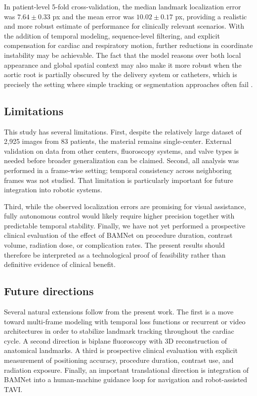\documentclass[preprint,12pt,authoryear]{elsarticle}
\begin{document}
In patient-level 5-fold cross-validation, the median landmark localization error was $7.64 \pm 0.33$ px and the mean error was $10.02 \pm 0.17$ px, providing a realistic and more robust estimate of performance for clinically relevant scenarios. With the addition of temporal modeling, sequence-level filtering, and explicit compensation for cardiac and respiratory motion, further reductions in coordinate instability may be achievable. The fact that the model reasons over both local appearance and global spatial context may also make it more robust when the aortic root is partially obscured by the delivery system or catheters, which is precisely the setting where simple tracking or segmentation approaches often fail \citep{smits2025_autonomous,clinicaltrials_nct07152574}.

\subsection{Limitations}

This study has several limitations. First, despite the relatively large dataset of 2,925 images from 83 patients, the material remains single-center. External validation on data from other centers, fluoroscopy systems, and valve types is needed before broader generalization can be claimed. Second, all analysis was performed in a frame-wise setting; temporal consistency across neighboring frames was not studied. That limitation is particularly important for future integration into robotic systems.

Third, while the observed localization errors are promising for visual assistance, fully autonomous control would likely require higher precision together with predictable temporal stability. Finally, we have not yet performed a prospective clinical evaluation of the effect of BAMNet on procedure duration, contrast volume, radiation dose, or complication rates. The present results should therefore be interpreted as a technological proof of feasibility rather than definitive evidence of clinical benefit.

\subsection{Future directions}

Several natural extensions follow from the present work. The first is a move toward multi-frame modeling with temporal loss functions or recurrent or video architectures in order to stabilize landmark tracking throughout the cardiac cycle. A second direction is biplane fluoroscopy with 3D reconstruction of anatomical landmarks. A third is prospective clinical evaluation with explicit measurement of positioning accuracy, procedure duration, contrast use, and radiation exposure. Finally, an important translational direction is integration of BAMNet into a human-machine guidance loop for navigation and robot-assisted TAVI.
\end{document}
